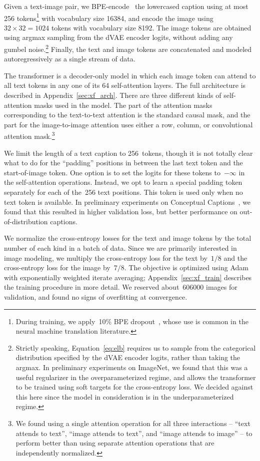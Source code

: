 \documentclass{article}
\begin{document}
Given a text-image pair, we BPE-encode~\cite{sennrich2015neural} the lowercased caption using at most 256 tokens\footnote{During training, we apply~10\% BPE dropout~\cite{provilkov2019bpe}, whose use is common in the neural machine translation literature.} with vocabulary size \num{16384}, and encode the image using $32 \times 32 = 1024$ tokens with vocabulary size \num{8192}. The image tokens are obtained using argmax sampling from the dVAE encoder logits, without adding any gumbel noise.\footnote{Strictly speaking, Equation~\ref{eq:elb} requires us to sample from the categorical distribution specified by the dVAE encoder logits, rather than taking the argmax. In preliminary experiments on ImageNet, we found that this was a useful regularizer in the overparameterized regime, and allows the transformer to be trained using soft targets for the cross-entropy loss. We decided against this here since the model in consideration is in the underparameterized regime.} Finally, the text and image tokens are concatenated and modeled autoregressively as a single stream of data.

The transformer is a decoder-only model in which each image token can attend to all text tokens in any one of its 64 self-attention layers. The full architecture is described in Appendix~\ref{sec:xf_arch}. There are three different kinds of self-attention masks used in the model. The part of the attention masks corresponding to the text-to-text attention is the standard causal mask, and the part for the image-to-image attention uses either a row, column, or convolutional attention mask.\footnote{We found using a single attention operation for all three interactions -- ``text attends to text'', ``image attends to text'', and ``image attends to image'' -- to perform better than using separate attention operations that are independently normalized.} 

We limit the length of a text caption to 256~tokens, though it is not totally clear what to do for the ``padding'' positions in between the last text token and the start-of-image token. One option is to set the logits for these tokens to~$-\infty$ in the self-attention operations. Instead, we opt to learn a special padding token separately for each of the~256 text positions. This token is used only when no text token is available. In preliminary experiments on Conceptual Captions~\cite{sharma2018conceptual}, we found that this resulted in higher validation loss, but better performance on out-of-distribution captions.

We normalize the cross-entropy losses for the text and image tokens by the total number of each kind in a batch of data. Since we are primarily interested in image modeling, we multiply the cross-entropy loss for the text by~$1 / 8$ and the cross-entropy loss for the image by~$7 / 8$. The objective is optimized using Adam with exponentially weighted iterate averaging; Appendix~\ref{sec:xf_train} describes the training procedure in more detail. We reserved about~\num{606000} images for validation, and found no signs of overfitting at convergence.
\end{document}
